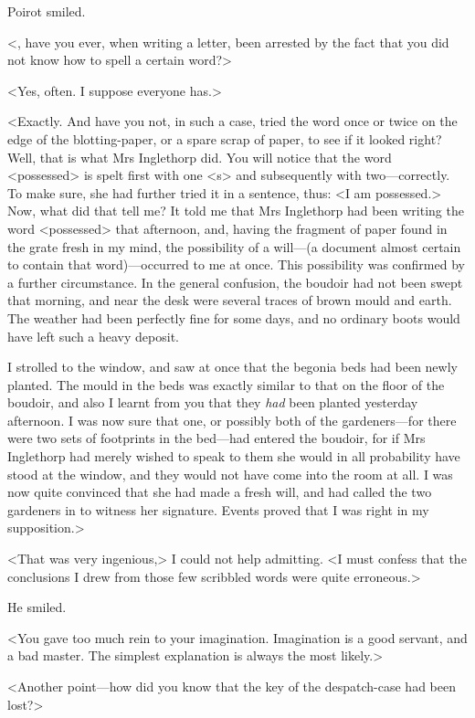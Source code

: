  Poirot smiled. 

 <, have you ever, when writing a letter, been arrested by the fact that you did not know how to spell a certain word?> 

 <Yes, often. I suppose everyone has.> 

 <Exactly. And have you not, in such a case, tried the word once or twice on the edge of the blotting-paper, or a spare scrap of paper, to see if it looked right? Well, that is what Mrs Inglethorp did. You will notice that the word <possessed> is spelt first with one <s> and subsequently with two—correctly. To make sure, she had further tried it in a sentence, thus: <I am possessed.> Now, what did that tell me? It told me that Mrs Inglethorp had been writing the word <possessed> that afternoon, and, having the fragment of paper found in the grate fresh in my mind, the possibility of a will—(a document almost certain to contain that word)—occurred to me at once. This possibility was confirmed by a further circumstance. In the general confusion, the boudoir had not been swept that morning, and near the desk were several traces of brown mould and earth. The weather had been perfectly fine for some days, and no ordinary boots would have left such a heavy deposit. 

 I strolled to the window, and saw at once that the begonia beds had been newly planted. The mould in the beds was exactly similar to that on the floor of the boudoir, and also I learnt from you that they \emph{had} been planted yesterday afternoon. I was now sure that one, or possibly both of the gardeners—for there were two sets of footprints in the bed—had entered the boudoir, for if Mrs Inglethorp had merely wished to speak to them she would in all probability have stood at the window, and they would not have come into the room at all. I was now quite convinced that she had made a fresh will, and had called the two gardeners in to witness her signature. Events proved that I was right in my supposition.> 

 <That was very ingenious,> I could not help admitting. <I must confess that the conclusions I drew from those few scribbled words were quite erroneous.> 

 He smiled. 

 <You gave too much rein to your imagination. Imagination is a good servant, and a bad master. The simplest explanation is always the most likely.> 

 <Another point—how did you know that the key of the despatch-case had been lost?> 

